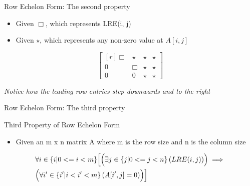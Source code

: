 \documentclass{beamer}
\begin{document}
\begin{frame}{Row Echelon Form: The second property}
  \begin{example}
    \begin{itemize}
      \item Given $\Box$, which represents LRE(i, j)
      \item Given $\star$, which represents any non-zero value at $A[i, j]$
    \end{itemize}
    \begin{equation}
      \begin{bmatrix*}[r]
        \Box & \star & \star & \star \\
        0 & \Box & \star & \star \\
        0 & 0 & \star & \star 
      \end{bmatrix*}
    \end{equation}

    \textit{Notice how the leading row entries step downwards and to the right}
  \end{example}
\end{frame}

\begin{frame}{Row Echelon Form: The third property}
  \begin{block}{Third Property of Row Echelon Form}
    \begin{itemize}
    \item Given an m x n matrix A where m is the row size and n is the column size
    \end{itemize}
    \begin{equation}
      \begin{split}
        &\forall i \in \{i | 0 <= i < m \} \Bigl[ \Bigl( \exists j \in \{ j | 0 <= j < n \} \left(LRE(i, j)\right) \Bigr) \implies \Bigr. \\
        &\Bigl. \Bigl( \forall i^{\prime} \in \{ i^{\prime} | i < i^{\prime} < m \} \left( A[i^{\prime}, j] = 0 \right) \Bigr) \Bigr]
      \end{split}
    \end{equation}
  \end{block}
\end{frame}
\end{document}
